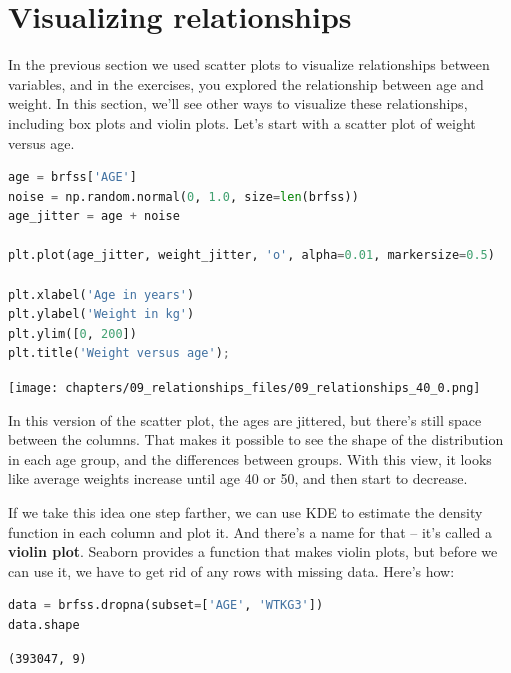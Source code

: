 \hypertarget{visualizing-relationships}{%
\section{Visualizing relationships}\label{visualizing-relationships}}

In the previous section we used scatter plots to visualize relationships
between variables, and in the exercises, you explored the relationship
between age and weight. In this section, we'll see other ways to
visualize these relationships, including box plots and violin plots.
Let's start with a scatter plot of weight versus age.

\begin{lstlisting}[language=Python,style=source]
age = brfss['AGE']
noise = np.random.normal(0, 1.0, size=len(brfss))
age_jitter = age + noise

plt.plot(age_jitter, weight_jitter, 'o', alpha=0.01, markersize=0.5)

plt.xlabel('Age in years')
plt.ylabel('Weight in kg')
plt.ylim([0, 200])
plt.title('Weight versus age');
\end{lstlisting}

\begin{center}
\texttt{[image: chapters/09\_relationships\_files/09\_relationships\_40\_0.png]}
\end{center}

In this version of the scatter plot, the ages are jittered, but there's
still space between the columns. That makes it possible to see the shape
of the distribution in each age group, and the differences between
groups. With this view, it looks like average weights increase until age
40 or 50, and then start to decrease.

If we take this idea one step farther, we can use KDE to estimate the
density function in each column and plot it. And there's a name for that
-- it's called a \textbf{violin plot}. Seaborn provides a function that
makes violin plots, but before we can use it, we have to get rid of any
rows with missing data. Here's how:

\begin{lstlisting}[language=Python,style=source]
data = brfss.dropna(subset=['AGE', 'WTKG3'])
data.shape
\end{lstlisting}

\begin{lstlisting}[style=output]
(393047, 9)
\end{lstlisting}

